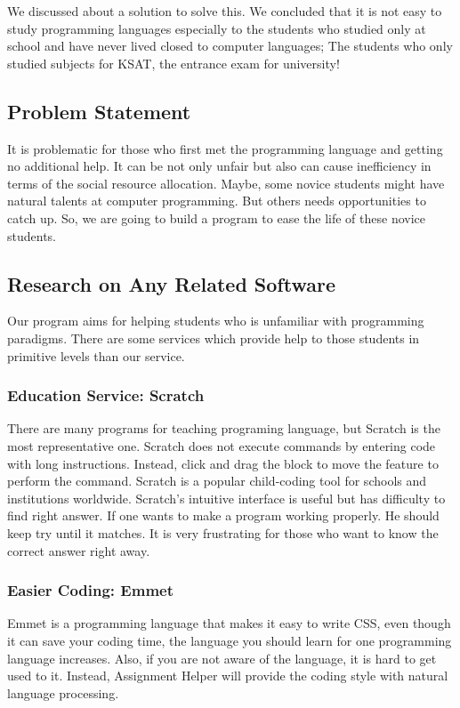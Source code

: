 \documentclass[conference]{IEEEtran}
\begin{document}
We discussed about a solution to solve this. We concluded that it is not easy to study programming languages especially to the students who studied only at school and have never lived closed to computer languages; The students who only studied subjects for KSAT, the entrance exam for university!

\subsection{Problem Statement}
It is problematic for those who first met the programming language and getting no additional help. It can be not only unfair but also can cause inefficiency in terms of the social resource allocation. Maybe, some novice students might have natural talents at computer programming. But others needs opportunities to catch up. So, we are going to build a program to ease the life of these novice students.


\subsection{Research on Any Related Software}
Our program aims for helping students who is unfamiliar with programming paradigms. There are some services which provide help to those students in primitive levels than our service.

\subsubsection{Education Service: Scratch}
There are many programs for teaching programing language, but Scratch is the most representative one. Scratch does not execute commands by entering code with long instructions. Instead, click and drag the block to move the feature to perform the command. Scratch is a popular child-coding tool for schools and institutions worldwide. Scratch’s intuitive interface is useful but has difficulty to find right answer. If one wants to make a program working properly. He should keep try until it matches. It is very frustrating for those who want to know the correct answer right away.

\subsubsection{Easier Coding: Emmet}
Emmet is a programming language that makes it easy to write CSS, even though it can save your coding time, the language you should learn for one programming language increases. Also, if you are not aware of the language, it is hard to get used to it. Instead, Assignment Helper will provide the coding style with natural language processing.
\end{document}
